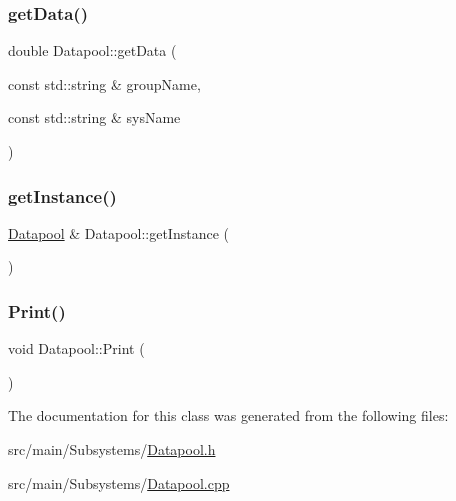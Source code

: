 \mbox{\label{classDatapool_a005421262c8c1a71fa93d167492ebb50}} 
\subsubsection{\texorpdfstring{get\+Data()}{getData()}}
{\footnotesize\ttfamily double Datapool\+::get\+Data (\begin{DoxyParamCaption}\item[{const std\+::string \&}]{group\+Name,  }\item[{const std\+::string \&}]{sys\+Name }\end{DoxyParamCaption})}

\mbox{\label{classDatapool_a9cfbb881291c80d851d0df66341b6299}} 
\subsubsection{\texorpdfstring{get\+Instance()}{getInstance()}}
{\footnotesize\ttfamily \hyperlink{classDatapool}{Datapool} \& Datapool\+::get\+Instance (\begin{DoxyParamCaption}{ }\end{DoxyParamCaption})\hspace{0.3cm}{\ttfamily [static]}}

\mbox{\label{classDatapool_afae02fe80bca3b1978317f2f7be8bec1}} 
\subsubsection{\texorpdfstring{Print()}{Print()}}
{\footnotesize\ttfamily void Datapool\+::\+Print (\begin{DoxyParamCaption}{ }\end{DoxyParamCaption})}



The documentation for this class was generated from the following files\+:\begin{DoxyCompactItemize}
\item 
src/main/\+Subsystems/\hyperlink{Datapool_8h}{Datapool.\+h}\item 
src/main/\+Subsystems/\hyperlink{Datapool_8cpp}{Datapool.\+cpp}\end{DoxyCompactItemize}
